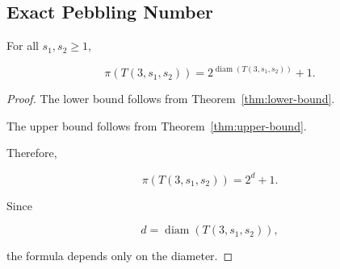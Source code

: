 \subsection{Exact Pebbling Number}



\begin{theorem}
\label{thm:exact}

For all $s_1,s_2\ge1$,

\[
\pi(T(3,s_1,s_2))
=
2^{\operatorname{diam}(T(3,s_1,s_2))}+1 .
\]

\end{theorem}



\begin{proof}

The lower bound follows from
Theorem~\ref{thm:lower-bound}.

The upper bound follows from
Theorem~\ref{thm:upper-bound}.

Therefore,

\[
\pi(T(3,s_1,s_2))=2^d+1 .
\]

Since

\[
d=\operatorname{diam}(T(3,s_1,s_2)),
\]

the formula depends only on the diameter.

\end{proof}
